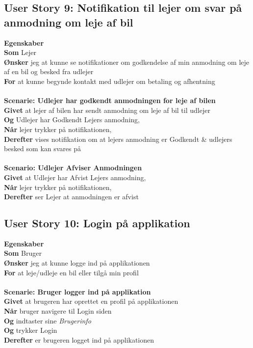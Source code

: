 \documentclass[Kravspecifikation/Kravspec_Main.tex]{subfiles}
\begin{document}
\subsection{User Story 9: Notifikation til lejer om svar på anmodning om leje af bil}
\textbf{Egenskaber}\\
\textbf{Som} Lejer \\
\textbf{Ønsker} jeg at kunne se notifikationer om godkendelse af min anmodning om leje af en bil og besked fra udlejer\\
\textbf{For} at kunne begynde kontakt med udlejer om betaling og afhentning
\\\\
\textbf{Scenarie: Udlejer har godkendt anmodningen for leje af bilen}\\
\textbf{Givet} at lejer af bilen har sendt anmodning om leje af bil til udlejer \\
\textbf{Og} Udlejer har Godkendt Lejers anmodning,\\
\textbf{Når} lejer trykker på notifikationen, \\
\textbf{Derefter} vises notifikation om at lejers anmodning er Godkendt \& udlejers besked som kan svares på \\\\
\textbf{Scenario: Udlejer Afviser Anmodningen}\\
\textbf{Givet} at Udlejer har Afvist Lejers anmodning,\\
\textbf{Når} lejer trykker på notifikationen,\\
\textbf{Derefter} ser Lejer at anmodningen er afvist

\subsection{User Story 10: Login på applikation}
\textbf{Egenskaber}\\
\textbf{Som} Bruger \\
\textbf{Ønsker} jeg at kunne logge ind på applikationen\\
\textbf{For} at leje/udleje en bil eller tilgå min profil
\\\\
\textbf{Scenarie: Bruger logger ind på applikation}\\
\textbf{Givet} at brugeren har oprettet en profil på applikationen\\
\textbf{Når} bruger navigere til Login siden \\
\textbf{Og} indtaster sine \textit{Brugerinfo}\\
\textbf{Og} trykker Login\\
\textbf{Derefter} er brugeren logget ind på applikationen
\end{document}
